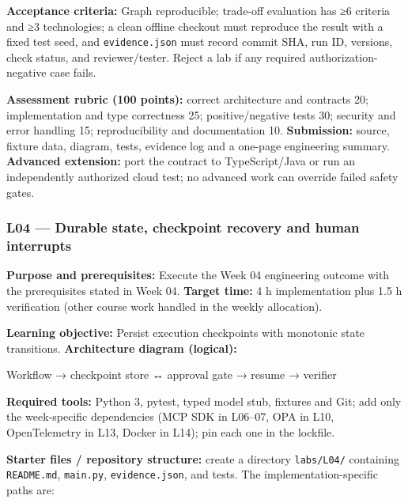 \documentclass[
  10pt,
]{article}
\newenvironment{Shaded}{\begin{snugshade}}{\end{snugshade}}
\newcommand{\NormalTok}[1]{#1}
\begin{document}
\textbf{Acceptance criteria:} Graph reproducible; trade-off evaluation
has ≥6 criteria and ≥3 technologies; a clean offline checkout must
reproduce the result with a fixed test seed, and \texttt{evidence.json}
must record commit SHA, run ID, versions, check status, and
reviewer/tester. Reject a lab if any required authorization-negative
case fails.

\textbf{Assessment rubric (100 points):} correct architecture and
contracts 20; implementation and type correctness 25; positive/negative
tests 30; security and error handling 15; reproducibility and
documentation 10. \textbf{Submission:} source, fixture data, diagram,
tests, evidence log and a one-page engineering summary. \textbf{Advanced
extension:} port the contract to TypeScript/Java or run an independently
authorized cloud test; no advanced work can override failed safety
gates.

\subsubsection{L04 --- Durable state, checkpoint recovery and human
interrupts}\label{l04-durable-state-checkpoint-recovery-and-human-interrupts}

\textbf{Purpose and prerequisites:} Execute the Week 04 engineering
outcome with the prerequisites stated in Week 04. \textbf{Target time:}
4 h implementation plus 1.5 h verification (other course work handled in
the weekly allocation).

\textbf{Learning objective:} Persist execution checkpoints with
monotonic state transitions. \textbf{Architecture diagram (logical):}

\begin{Shaded}
\begin{Highlighting}[]
\NormalTok{Workflow → checkpoint store ↔ approval gate → resume →}
\NormalTok{verifier}
\end{Highlighting}
\end{Shaded}

\textbf{Required tools:} Python 3, pytest, typed model stub, fixtures
and Git; add only the week-specific dependencies (MCP SDK in L06--07,
OPA in L10, OpenTelemetry in L13, Docker in L14); pin each one in the
lockfile.

{\raggedright \textbf{Starter files / repository structure:} create a directory
\texttt{labs/\allowbreak L04/} containing \texttt{README.md}, \texttt{main.py},
\texttt{evidence.json}, and tests. The implementation-specific paths
are:\par}
\end{document}
